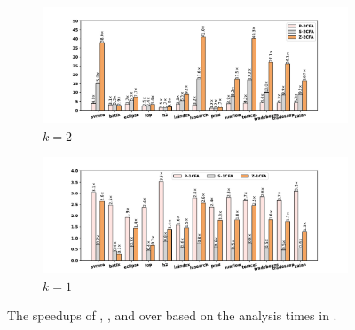  


\begin{figure}[t]
\centering
 \begin{subfigure}[b]{\textwidth}
     \centering
     \includegraphics[width=\textwidth]{speedupktwo.pdf}
     \caption{$k=2$}
     \label{fig:twocfaspeedup}
\end{subfigure}
\begin{subfigure}[b]{\textwidth}
     \centering
     \includegraphics[width=\textwidth]{speedupkone.pdf}
     \caption{$k=1$}
     \label{fig:onecfaspeedup}
 \end{subfigure}
 \hfill
\caption{The speedups of , , and  over  based on the analysis times in .
}
\label{fig:speedups}
\end{figure}

